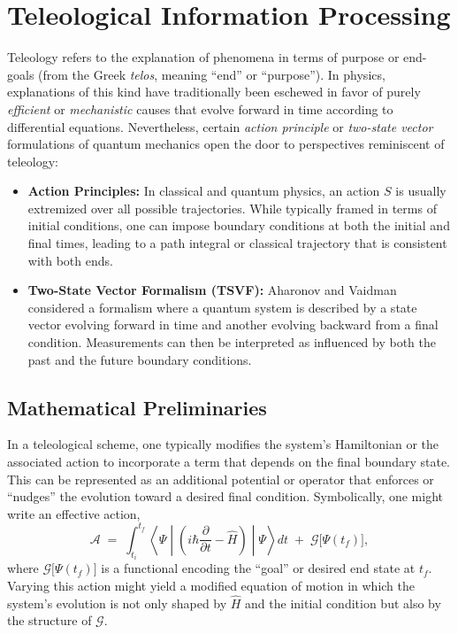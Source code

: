 \documentclass[11pt]{article}
\begin{document}
\section{Teleological Information Processing}
\label{sec:background-teleological}

Teleology refers to the explanation of phenomena in terms of purpose or end-goals (from the Greek \emph{telos}, meaning ``end'' or ``purpose''). In physics, explanations of this kind have traditionally been eschewed in favor of purely \emph{efficient} or \emph{mechanistic} causes that evolve forward in time according to differential equations. Nevertheless, certain \emph{action principle} or \emph{two-state vector} formulations of quantum mechanics open the door to perspectives reminiscent of teleology:

\begin{itemize}
    \item \textbf{Action Principles:} In classical and quantum physics, an action $S$ is usually extremized over all possible trajectories. While typically framed in terms of initial conditions, one can impose boundary conditions at both the initial and final times, leading to a path integral or classical trajectory that is consistent with both ends.
    \item \textbf{Two-State Vector Formalism (TSVF):} Aharonov and Vaidman \cite{Aharonov1964} considered a formalism where a quantum system is described by a state vector evolving forward in time and another evolving backward from a final condition. Measurements can then be interpreted as influenced by both the past and the future boundary conditions.
\end{itemize}

\subsection{Mathematical Preliminaries}
In a teleological scheme, one typically modifies the system’s Hamiltonian or the associated action to incorporate a term that depends on the final boundary state. This can be represented as an additional potential or operator that enforces or ``nudges'' the evolution toward a desired final condition. Symbolically, one might write an effective action,
\begin{equation}
\label{eq:ActionTeleology}
\mathcal{A} \;=\;\int_{t_i}^{t_f} \left\langle \Psi \middle\vert 
\left(i\hbar \frac{\partial}{\partial t} - \hat{H} \right)
\middle\vert \Psi \right\rangle dt \;+\; \mathcal{G}\bigl[\Psi(t_f)\bigr],
\end{equation}
where $\mathcal{G}\bigl[\Psi(t_f)\bigr]$ is a functional encoding the ``goal'' or desired end state at $t_f$. Varying this action might yield a modified equation of motion in which the system’s evolution is not only shaped by $\hat{H}$ and the initial condition but also by the structure of $\mathcal{G}$.
\end{document}
